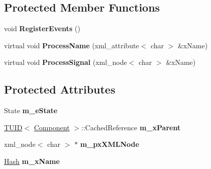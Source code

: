 \subsection*{Protected Member Functions}
\begin{DoxyCompactItemize}
\item 
\hypertarget{class_k_g_e_1_1_component_a153f8e07328fc76e7306b6ab64bba4e9}{void {\bfseries Register\-Events} ()}\label{class_k_g_e_1_1_component_a153f8e07328fc76e7306b6ab64bba4e9}

\item 
\hypertarget{class_k_g_e_1_1_component_a402dd1c6164d2731555b19908bf210ab}{virtual void {\bfseries Process\-Name} (xml\-\_\-attribute$<$ char $>$ \&x\-Name)}\label{class_k_g_e_1_1_component_a402dd1c6164d2731555b19908bf210ab}

\item 
\hypertarget{class_k_g_e_1_1_component_aacb0aac1be9ddadadab53712d3079791}{virtual void {\bfseries Process\-Signal} (xml\-\_\-node$<$ char $>$ \&x\-Name)}\label{class_k_g_e_1_1_component_aacb0aac1be9ddadadab53712d3079791}

\end{DoxyCompactItemize}
\subsection*{Protected Attributes}
\begin{DoxyCompactItemize}
\item 
\hypertarget{class_k_g_e_1_1_component_ae406ae60a24d97f3c3627dbd64bc2996}{State {\bfseries m\-\_\-e\-State}}\label{class_k_g_e_1_1_component_ae406ae60a24d97f3c3627dbd64bc2996}

\item 
\hypertarget{class_k_g_e_1_1_component_a66359dc6ac2b450db0f11238d1531867}{\hyperlink{class_k_g_e_1_1_t_u_i_d}{T\-U\-I\-D}$<$ \hyperlink{class_k_g_e_1_1_component}{Component} $>$\-::Cached\-Reference {\bfseries m\-\_\-x\-Parent}}\label{class_k_g_e_1_1_component_a66359dc6ac2b450db0f11238d1531867}

\item 
\hypertarget{class_k_g_e_1_1_component_ad00caafcd6af78a11add9c14f89e1fb9}{xml\-\_\-node$<$ char $>$ $\ast$ {\bfseries m\-\_\-px\-X\-M\-L\-Node}}\label{class_k_g_e_1_1_component_ad00caafcd6af78a11add9c14f89e1fb9}

\item 
\hypertarget{class_k_g_e_1_1_component_a08ba9e5d1ee04c5ea4f770279f4c93a1}{\hyperlink{class_k_g_e_1_1_hash}{Hash} {\bfseries m\-\_\-x\-Name}}\label{class_k_g_e_1_1_component_a08ba9e5d1ee04c5ea4f770279f4c93a1}

\end{DoxyCompactItemize}
